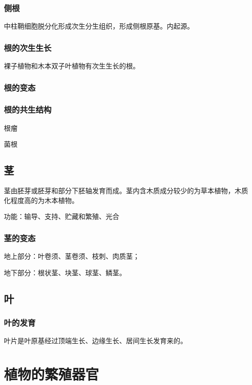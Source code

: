 \subsubsection{侧根}

中柱鞘细胞脱分化形成次生分生组织，形成侧根原基。内起源。

\subsubsection{根的次生生长}

裸子植物和木本双子叶植物有次生生长的根。

\subsubsection{根的变态}

\subsubsection{根的共生结构}

根瘤

菌根

\subsection{茎}

茎由胚芽或胚芽和部分下胚轴发育而成。茎内含木质成分较少的为草本植物，木质化程度高的为木本植物。

功能：输导、支持、贮藏和繁殖、光合

\subsubsection{茎的变态}

地上部分：叶卷须、茎卷须、枝刺、肉质茎；

地下部分：根状茎、块茎、球茎、鳞茎。


\subsection{叶}

\subsubsection{叶的发育}

叶片是叶原基经过顶端生长、边缘生长、居间生长发育来的。



\section{植物的繁殖器官}

